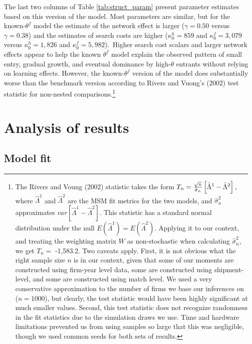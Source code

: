 \documentclass[12pt]{article}
\begin{document}
The last two columns of Table \ref{tab:struct_param} present parameter
estimates based on this version of the model. Most parameters are similar,
but for the known-$\theta ^{f}$ model the estimate of the network effect is
larger ($\gamma =0.50$ versus $\gamma =0.38$) and the estimates of search
costs are higher ($\kappa _{0}^{h}=859$ and $\kappa _{0}^{f}=3,079$ versus $%
\kappa _{0}^{h}=1,826$ and $\kappa _{0}^{f}=5,982$).\ Higher search cost
scalars and larger network effects appear to help the known $\theta ^{f}$
model explain the observed pattern of small entry, gradual growth, and
eventual dominance by high-$\theta $ entrants without relying on learning
effects. However, the known-$\theta ^{f}$ version of the model does
substantially worse than the benchmark version according to Rivers and
Vuong's (2002) test statistic for non-nested comparisons.\footnote{%
The Rivers and Voung (2002) statistic takes the form $T_{n}=\frac{\sqrt{n}}{%
\hat{\sigma}_{n}}\left[ \hat{\Lambda}^{1}-\hat{\Lambda}^{2}\right] ,$ where $%
\hat{\Lambda}^{1}$ and $\hat{\Lambda}^{2}$ are the MSM fit metrics for the
two models, and $\hat{\sigma}_{n}^{2}$ approximates $var\left[ \hat{\Lambda}%
^{1}-\hat{\Lambda}^{2}\right] .$ This statistic has a standard normal
distribution under the null $E(\hat{\Lambda}^{1})=E(\hat{\Lambda}^{2}).$
Applying it to our context, and treating the weighting matrix $W$ as
non-stochastic when calculating $\hat{\sigma}_{n}^{2}$, we get $T_{n}=$
-1,583.2. Two caveats apply. First, it is not obvious what the right sample
size $n$ is in our context, given that some of our moments are constructed
using firm-year level data, some are constructed using shipment-level, and
some are constructed using match level. We used a very conservative
approximation to the number of firms we base our inferences on ($n=1000$),
but clearly, the test statistic would have been highly significant at much
smaller values. Second, this test statistic does not recognize randomness in
the fit statistics due to the simulation draws we use. Time and hardware
limitations prevented us from using samples so large that this was
negligible, though we used common seeds for both sets of results.\medskip}

\section{Analysis of results}

\subsection{Model fit}
\end{document}

